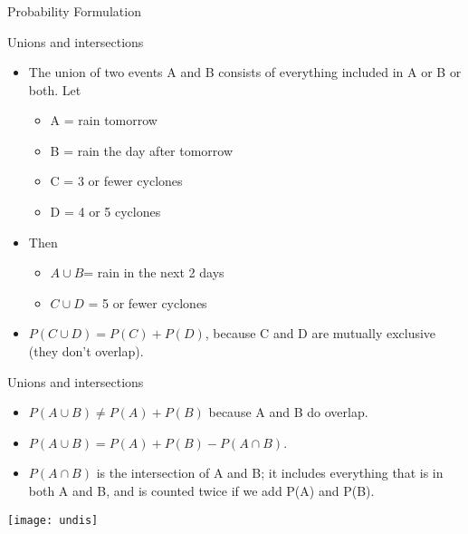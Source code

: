 \begin{frame}[fragile]\frametitle{}
\begin{center}
{\Large Probability Formulation}
\end{center}
\end{frame}


\begin{frame}{Unions and intersections }

\begin{itemize}
\item The union of two events A and B consists of everything included in A 
or B or both. Let  
\begin{itemize}
\item A = rain tomorrow
\item  B = rain the day after tomorrow
\item C = 3 or fewer cyclones
\item D = 4 or 5 cyclones
\end{itemize}
\item Then  
\begin{itemize}
\item $A \cup B$= rain in the next 2 days
\item $C \cup D$ = 5 or fewer cyclones
\end{itemize}
\item $ P(C \cup D) = P(C) + P(D)$, because C and D  are mutually exclusive 
(they don't overlap). 
\end{itemize}
\end{frame}

\begin{frame}{Unions and intersections }

\begin{itemize}
\item $P(A \cup B) \neq P(A) + P(B)$ because A and B do overlap. 
\item$ P(A \cup B) =P(A) + P(B) - P(A \cap B)$. 
\item   $P(A \cap B)$ is the intersection of A and B; it includes everything that is in 
both A and B, and is counted twice if we add P(A) and P(B). 
\end{itemize}

\begin{center}
\texttt{[image: undis]}
\end{center}
\end{frame}

